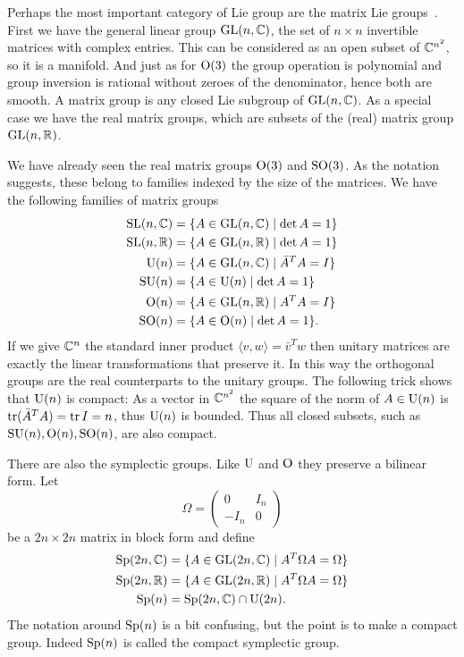 Perhaps the most important category of Lie group are the matrix Lie groups~\cite[Definition~1.4]{Hall2015}.
First we have the general linear group $\mathrm{GL}(n,\mathbb{C})$, the set of $n\times n$ invertible matrices with complex entries.
This can be considered as an open subset of $\mathbb{C}^{n^2}$, so it is a manifold. And just as for $\mathrm{O}(3)$ the group operation is polynomial and group inversion is rational without zeroes of the denominator, hence both are smooth.
A matrix group is any closed Lie subgroup of $\mathrm{GL}(n,\mathbb{C})$.
As a special case we have the real matrix groups, which are subsets of the (real) matrix group $\mathrm{GL}(n,\mathbb{R})$.

We have already seen the real matrix groups $\mathrm{O}(3)$ and $\mathrm{SO}(3)$.
As the notation suggests, these belong to families indexed by the size of the matrices.
We have the following families of matrix groups
\begin{align*}
\mathrm{SL}(n,\mathbb{C}) &= \{ A \in \mathrm{GL}(n,\mathbb{C}) \mid \det A = 1 \} \\
\mathrm{SL}(n,\mathbb{R}) &= \{ A \in \mathrm{GL}(n,\mathbb{R}) \mid \det A = 1 \} \\
\mathrm{U}(n) &= \{ A \in \mathrm{GL}(n,\mathbb{C}) \mid \bar{A}^T A = I \} \\
\mathrm{SU}(n) &= \{ A \in \mathrm{U}(n) \mid \det A = 1 \} \\
\mathrm{O}(n) &= \{ A \in \mathrm{GL}(n,\mathbb{R}) \mid A^T A = I \} \\
\mathrm{SO}(n) &= \{ A \in \mathrm{O}(n) \mid \det A = 1 \}.
\end{align*}
If we give $\mathbb{C}^n$ the standard inner product $\langle v,w \rangle = \bar{v}^Tw$ then unitary matrices are exactly the linear transformations that preserve it.
In this way the orthogonal groups are the real counterparts to the unitary groups.
The following trick shows that $\mathrm{U}(n)$ is compact: As a vector in $\mathbb{C}^{n^2}$ the square of the norm of $A \in \mathrm{U}(n)$ is $\operatorname{tr}(\bar{A}^T A) = \operatorname{tr} I = n$, thus $\mathrm{U}(n)$ is bounded.
Thus all closed subsets, such as $\mathrm{SU}(n), \mathrm{O}(n),\mathrm{SO}(n)$, are also compact.

There are also the symplectic groups.
Like $\mathrm{U}$ and $\mathrm{O}$ they preserve a bilinear form.
Let 
\[
\Omega = \begin{pmatrix}
0 & I_n \\ - I_n & 0
\end{pmatrix}
\]
be a $2n\times 2n$ matrix in block form and define
\begin{align*}
\mathrm{Sp}(2n,\mathbb{C}) &= \{ A \in \mathrm{GL}(2n,\mathbb{C}) \mid A^T\Omega A = \Omega \} \\
\mathrm{Sp}(2n,\mathbb{R}) &= \{ A \in \mathrm{GL}(2n,\mathbb{R}) \mid A^T\Omega A = \Omega \} \\
\mathrm{Sp}(n) &= \mathrm{Sp}(2n,\mathbb{C}) \cap \mathrm{U}(2n).
\end{align*}
The notation around $\mathrm{Sp}(n)$ is a bit confusing, but the point is to make a compact group.
Indeed $\mathrm{Sp}(n)$ is called the compact symplectic group.

